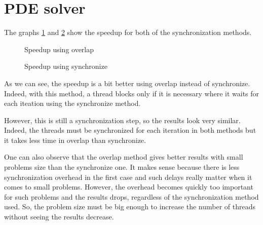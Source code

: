 \section{PDE solver}

The graphs \ref{overlap} and \ref{synchro} show the speedup for both of the synchronization methods.


\begin{figure}[H]
  \begin{center}
  \end{center}
  \caption{Speedup using overlap}
  \label{overlap}
\end{figure}


\begin{figure}[!h]
  \begin{center}
  \end{center}
  \caption{Speedup using synchronize}
  \label{synchro}
\end{figure}

As we can see, the speedup is a bit better using overlap instead of synchronize. Indeed, with this method, a thread blocks only if it is necessary where it waits for each iteation using the synchronize method. 

However, this is still a synchronization step, so the results look very similar. Indeed, the threads must be synchronized for each iteration in both methods but it takes less time in overlap than synchronize.

One can also observe that the overlap method gives better results with small problems size than the synchronize one. It makes sense because there is less synchronization overhead in the first case and such delays really matter when it comes to small problems. However, the overhead becomes quickly too important for such problems and the results drops, regardless of the synchronization method used. So, the problem size must be big enough to increase the number of threads without seeing the results decrease. 
